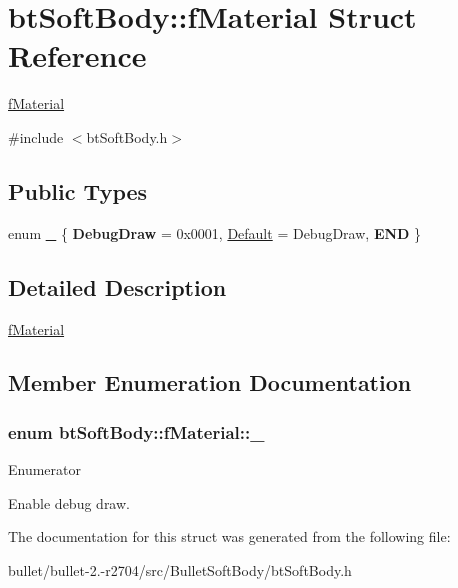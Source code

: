 \hypertarget{structbt_soft_body_1_1f_material}{\section{bt\+Soft\+Body\+:\+:f\+Material Struct Reference}
\label{structbt_soft_body_1_1f_material}
}


\hyperlink{structbt_soft_body_1_1f_material}{f\+Material}  




{\ttfamily \#include $<$bt\+Soft\+Body.\+h$>$}

\subsection*{Public Types}
\begin{DoxyCompactItemize}
\item 
enum \hyperlink{structbt_soft_body_1_1f_material_a6cc6df1c89b51761f169222062ec5ca8}{\+\_\+} \{ {\bfseries Debug\+Draw} = 0x0001, 
\hyperlink{structbt_soft_body_1_1f_material_a6cc6df1c89b51761f169222062ec5ca8af84f8e3bf24e47554c5278e654ddc0bb}{Default} = Debug\+Draw, 
{\bfseries E\+N\+D}
 \}
\end{DoxyCompactItemize}


\subsection{Detailed Description}
\hyperlink{structbt_soft_body_1_1f_material}{f\+Material} 

\subsection{Member Enumeration Documentation}
\hypertarget{structbt_soft_body_1_1f_material_a6cc6df1c89b51761f169222062ec5ca8}{
\subsubsection[{\+\_\+}]{\setlength{\rightskip}{0pt plus 5cm}enum {\bf bt\+Soft\+Body\+::f\+Material\+::\+\_\+}}}\label{structbt_soft_body_1_1f_material_a6cc6df1c89b51761f169222062ec5ca8}
\begin{Desc}
\item[Enumerator]\par
\begin{description}
\item[{\em 
\hypertarget{structbt_soft_body_1_1f_material_a6cc6df1c89b51761f169222062ec5ca8af84f8e3bf24e47554c5278e654ddc0bb}{Default}\label{structbt_soft_body_1_1f_material_a6cc6df1c89b51761f169222062ec5ca8af84f8e3bf24e47554c5278e654ddc0bb}
}]Enable debug draw. \end{description}
\end{Desc}


The documentation for this struct was generated from the following file\+:\begin{DoxyCompactItemize}
\item 
bullet/bullet-\/2.-\/r2704/src/\+Bullet\+Soft\+Body/bt\+Soft\+Body.\+h\end{DoxyCompactItemize}

